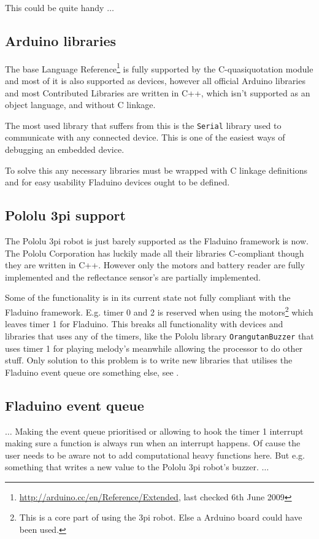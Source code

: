 \documentclass[a4paper, oneside, final]{memoir}
\let\fref\undefined
\begin{document}
This could be quite handy $\ldots$

\subsection{Arduino libraries}

The base Language
Reference\footnote{\url{http://arduino.cc/en/Reference/Extended}, last checked
  6th June 2009} is fully supported by the C-quasiquotation module and most of
it is also supported as devices, however all official Arduino libraries and most
Contributed Libraries are written in C++, which isn't supported as an object
language, and without C linkage. 

The most used library that suffers from this is the \texttt{Serial} library used
to communicate with any connected device. This is one of the easiest ways of
debugging an embedded device.

To solve this any necessary libraries must be wrapped with C linkage definitions
and for easy usability Fladuino devices ought to be defined.

\subsection{Pololu 3pi support}

The Pololu 3pi robot is just barely supported as the Fladuino framework is
now. The Pololu Corporation has luckily made all their libraries C-compliant
though they are written in C++. However only the motors and battery reader are
fully implemented and the reflectance sensor's are partially implemented.

Some of the functionality is in its current state not fully compliant with the
Fladuino framework. E.g. timer 0 and 2 is reserved when using the
motors\footnote{This is a core part of using the 3pi robot. Else a Arduino board
  could have been used.} which leaves timer 1 for Fladuino. This breaks all
functionality with devices and libraries that uses any of the timers, like the
Pololu library \texttt{OrangutanBuzzer} that uses timer 1 for playing melody's
meanwhile allowing the processor to do other stuff. Only solution to this
problem is to write new libraries that utilises the Fladuino event queue ore
something else, see \fref{sec:fladuino-event-queue}.

\subsection{Fladuino event queue}
\label{sec:fladuino-event-queue}
$\ldots$
Making the event queue prioritised or allowing to hook the timer 1 interrupt
making sure a function is always run when an interrupt happens. Of cause the
user needs to be aware not to add computational heavy functions here. But
e.g. something that writes a new value to the Pololu 3pi robot's buzzer.
$\ldots$
\end{document}
